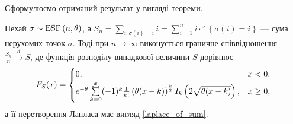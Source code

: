 Сформулюємо отриманий результат у вигляді теореми.
\begin{theorem}
    Нехай $\sigma \sim \ESF{n, \theta}$, а 
    $S_n = \sum_{i : \sigma(i) = i} i = \sum_{i=1}^n i \cdot \mathds{1}\left\{\sigma(i) = i \right\}$ --- сума нерухомих точок $\sigma$.
    Тоді при $n\to\infty$ виконується граничне
    співвідношення
    $\frac{S_n}{n} \overset{d}{\longrightarrow} S$,
    де функція розподілу випадкової величини $S$ дорівнює
    \begin{gather}
        F_{S}(x) = \begin{cases}
            0, & x < 0, \\
            e^{-\theta}
            \sum\limits_{k=0}^{\floor*{x}}
            (-1)^k \frac{1}{k!}\left(\theta(x-k)\right)^{\frac{k}{2}} I_k\left(2\sqrt{\theta(x-k)}\right), & x \geq 0,
        \end{cases}
    \end{gather}
    а її перетворення Лапласа має вигляд \eqref{laplace_of_sum}.
    

\end{theorem}
